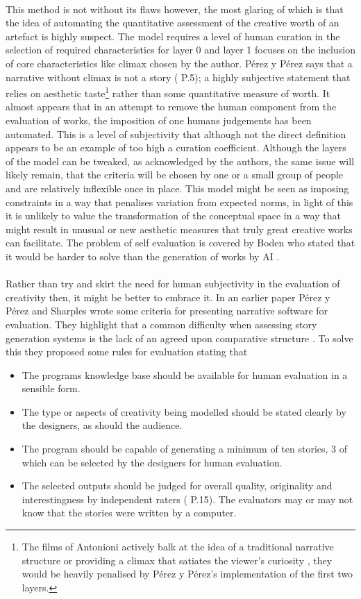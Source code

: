 \documentclass[letterpaper]{article}
\begin{document}
\\This method is not without its flaws however, the most glaring of which is that the idea of automating the quantitative assessment of the creative worth of an artefact is highly suspect. The model requires a level of human curation in the selection of required characteristics for layer 0 and layer 1 focuses on the inclusion of core characteristics like climax chosen by the author. P\'erez y P\'erez says that a narrative without climax is not a story ( P.5); a highly subjective statement that relies on aesthetic taste\footnote{The films of Antonioni actively balk at the idea of a traditional narrative structure or providing a climax that satiates the viewer's curiosity , they would be heavily penalised by P\'erez y P\'erez's implementation of the first two layers.} rather than some quantitative measure of worth. It almost appears that in an attempt to remove the human component from the evaluation of works, the imposition of one humans judgements has been automated. This is a level of subjectivity that although not the direct definition appears to be an example of too high a curation coefficient. Although the layers of the model can be tweaked, as acknowledged by the authors, the same issue will likely remain, that the criteria will be chosen by one or a small group of people and are relatively inflexible once in place. This model might be seen as imposing constraints in a way that penalises variation from expected norms, in light of this it is unlikely to value the transformation of the conceptual space in a way that might result in unusual or new aesthetic measures that truly great creative works can facilitate. The problem of self evaluation is covered by Boden who stated that it would be harder to solve than the generation of works by AI .\\
\\Rather than try and skirt the need for human subjectivity in the evaluation of creativity then, it might be better to embrace it. In an earlier paper P\'erez y P\'erez and Sharples wrote some criteria for presenting narrative software for evaluation. They highlight that a common difficulty when assessing story generation systems is the lack of an agreed upon comparative structure . To solve this they proposed some rules for evaluation stating that
\begin{itemize}
\item The programs knowledge base should be available for human evaluation in a sensible form. 
\item The type or aspects of creativity being modelled should be stated clearly by the designers, as should the audience.
\item The program should be capable of generating a minimum of ten stories, 3 of which can be selected by the designers for human evaluation. 
\item The selected outputs should be judged for overall quality, originality and interestingness by independent raters ( P.15). The evaluators may or may not know that the stories were written by a computer.
\end{itemize}
\end{document}

